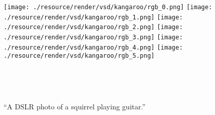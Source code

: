 \begin{figure*}[h!]
\begin{minipage}[c]{1\linewidth}
{\begin{minipage}[c]{1\linewidth}
                \texttt{[image: ./resource/render/vsd/kangaroo/rgb\_0.png]}\hspace{-0.85mm}
                \texttt{[image: ./resource/render/vsd/kangaroo/rgb\_1.png]}\hspace{-0.85mm}
                \texttt{[image: ./resource/render/vsd/kangaroo/rgb\_2.png]}\hspace{-0.85mm}
                \texttt{[image: ./resource/render/vsd/kangaroo/rgb\_3.png]}\hspace{-0.85mm}
                \texttt{[image: ./resource/render/vsd/kangaroo/rgb\_4.png]}\hspace{-0.85mm}
                \texttt{[image: ./resource/render/vsd/kangaroo/rgb\_5.png]}\hspace{-0.85mm}
            \end{minipage}
    }
    \end{minipage}
    \\
    \vspace{-1.5mm}
    \begin{minipage}[c]{1\linewidth}
        \centering
    \end{minipage}
    \\
    \vspace{2mm}
    \begin{minipage}[c]{1\linewidth}
        \centering
        \parbox{1\linewidth}{\centering ``A DSLR photo of a squirrel playing guitar.''}
        \vspace{-7mm}


\end{minipage}
\end{figure*}

